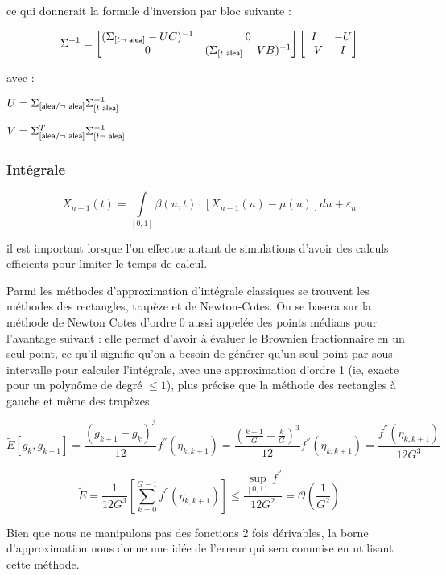 ce qui donnerait la formule d'inversion par bloc suivante :

$$
	\Sigma ^ {-1}
	=
	\begin{bmatrix}
		(\Sigma_{[t \neg\textsf{ alea}]} - UC) ^ {-1} & 0                                            \\
		0                                                & (\Sigma_{[t \textsf{ alea}]} - VB) ^ {-1}
	\end{bmatrix}
	\begin{bmatrix}
		I   & - U \\
		- V & I
	\end{bmatrix}
$$

avec :

$U = \Sigma_{[\textsf{alea} / \neg \textsf{ alea}]} \Sigma_{[t \textsf{ alea}]} ^ {-1} $

$V = \Sigma^T_{[\textsf{alea} / \neg \textsf{ alea}]} \Sigma_{[t \neg\textsf{ alea}]} ^ {-1}$

\subsubsection{Intégrale}

\begin{equation*}
	X_{n+1}(t) = \int\limits_{[0,1]} \beta(u,t) \cdot \left[ X_{n-1}(u) - \mu(u)\right]du + \varepsilon_n
\end{equation*}

il est important lorsque l'on effectue autant de simulations d'avoir des calculs efficients pour limiter le temps de calcul.

Parmi les méthodes d'approximation d'intégrale classiques se trouvent les méthodes des rectangles, trapèze et de Newton-Cotes. On se basera sur la méthode de Newton Cotes d'ordre 0 aussi appelée des points médians pour l'avantage suivant : elle permet d'avoir à évaluer le Brownien fractionnaire en un seul point, ce qu'il signifie qu'on a besoin de générer qu'un seul point par sous-intervalle pour calculer l'intégrale, avec une approximation d'ordre 1 (ie, exacte pour un polynôme de degré $\leq 1$), plus précise que la méthode des rectangles à gauche et même des trapèzes.

\begin{equation*}
	\tilde E[g_{k}, g_{k+1}] = \frac{(g_{k+1}-g_k)^3}{12}f ^{''}(\eta_{k,k+1}) = \frac{(\frac{k+1} G - \frac k G )^3}{12}f ^{''}(\eta_{k,k+1}) = \frac{f ^{''}(\eta_{k,k+1})}{12G^3}
\end{equation*}


\begin{equation*}
	\tilde E = \frac 1 {12 G^3} \left[\sum_{k=0}^{G-1}f ^{''}(\eta_{k, k+1})\right] \leq \frac{\sup\limits_{[0,1]} f^{''} }{12 G^2}= \mathcal O\left( \frac 1 {G^2} \right)
\end{equation*}

Bien que nous ne manipulons pas des fonctions 2 fois dérivables, la borne d'approximation nous donne une idée de l'erreur qui sera commise en utilisant cette méthode.
